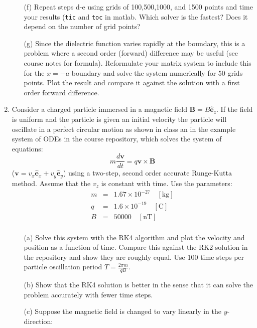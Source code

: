 \documentclass{article}
\begin{document}
\begin{enumerate}
\begin{itemize}
    \item[(f)]  Repeat steps d-e using grids of 100,500,1000, and 1500 points and time your results (\texttt{tic} and \texttt{toc} in matlab.  Which solver is the fastest?  Does it depend on the number of grid points?
    \item[(g)]  Since the dielectric function varies rapidly at the boundary, this is a problem where a second order (forward) difference may be useful (see course notes for formula).  Reformulate your matrix system to include this for the $x=-a$ boundary and solve the system numerically for 50 grids points.  Plot the result and compare it against the solution with a first order forward difference.  
  \end{itemize}
  \item  Consider a charged particle immersed in a magnetic field $\mathbf{B} = B \hat{\mathbf{e}}_z$.  If the field is uniform and the particle is given an initial velocity the particle will oscillate in a perfect circular motion as shown in class an in the example system of ODEs in the course repository, which solves the system of equations:
    \begin{equation}
      m \frac{d \mathbf{v}}{dt} = q \mathbf{v} \times \mathbf{B}
    \end{equation}  
    ($\mathbf{v}=v_x \hat{\mathbf{e}}_x + v_y \hat{\mathbf{e}}_y$) using a two-step, second order accurate Runge-Kutta method.  Assume that the $v_z$ is constant with time.  Use the parameters:  
    \begin{eqnarray}
      m &=& 1.67 \times 10^{-27} \quad \mathrm{[kg]} \\
      q &=& 1.6 \times 10^{-19} \quad \mathrm{[C]} \\
      B &=& 50000 \quad \mathrm{[nT]} \\
    \end{eqnarray}
  \begin{itemize}
    \item[(a)]  Solve this system with the RK4 algorithm and plot the velocity and position as a function of time.  Compare this against the RK2 solution in the repository and show they are roughly equal.  Use 100 time steps per particle oscillation period $T=\frac{2 \pi m}{q B}$.  
    \item[(b)]  Show that the RK4 solution is better in the sense that it can solve the problem accurately with fewer time steps.  
    \item[(c)]  Suppose the magnetic field is changed to vary linearly in the $y$-direction:

\end{itemize}
\end{enumerate}
\end{document}

